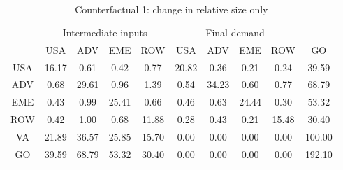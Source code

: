 \begin{table}[p]
\begin{center}
\caption{Counterfactual 1: change in relative size only}
\label{tab:iomat-size-counter}
\small
\begin{tabular}{cccccccccc}
\toprule
& \multicolumn{4}{c}{Intermediate inputs}& \multicolumn{4}{c}{Final demand} & \\
\cmidrule(rl){2-5}\cmidrule(rl){6-9}
 &USA &ADV &EME &ROW &USA &ADV &EME &ROW& GO\\
\midrule
USA& 16.17& 0.61& 0.42& 0.77& 20.82& 0.36& 0.21& 0.24& 39.59 \\
ADV& 0.68& 29.61& 0.96& 1.39& 0.54& 34.23& 0.60& 0.77& 68.79 \\
EME& 0.43& 0.99& 25.41& 0.66& 0.46& 0.63& 24.44& 0.30& 53.32 \\
ROW& 0.42& 1.00& 0.68& 11.88& 0.28& 0.43& 0.21& 15.48& 30.40 \\
\midrule
VA& 21.89& 36.57& 25.85& 15.70& 0.00& 0.00& 0.00& 0.00& 100.00\\
\midrule
GO& 39.59& 68.79& 53.32& 30.40& 0.00& 0.00& 0.00& 0.00& 192.10\\
\bottomrule
\end{tabular}
\normalsize
\end{center}
\end{table}
